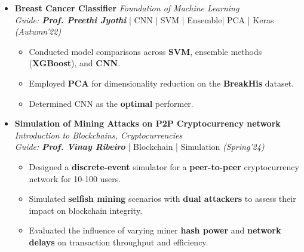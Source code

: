 \documentclass[a4paper,10pt]{article}
\begin{document}
\begin{itemize}[noitemsep,nolistsep]
\begin{itemize}[noitemsep,nolistsep]
    \item Built transformer-based neural machine translation on the CFLIT Hindi dataset for accurate cross-lingual translation.
    \vspace{0.07cm}
    
    \item Implemented text-to-speech synthesis to complete the end-to-end document-to-audio pipeline.
\end{itemize}

\item \textbf{Breast Cancer Classifier} \hfill {\emph{Foundation of Machine Learning}}\\
\emph{Guide: \textbf{Prof. Preethi Jyothi}} | CNN | SVM | Ensemble| PCA | Keras \hfill
\emph{(Autumn'22)}
\begin{itemize}[noitemsep,nolistsep]
\vspace{0.1cm}
    \item Conducted model comparisons across \textbf{SVM}, ensemble methods (\textbf{XGBoost}), and \textbf{CNN}.
    \vspace{0.07cm}
    
    \item Employed \textbf{PCA} for dimensionality reduction on the \textbf{BreakHis} dataset.    
    \vspace{0.07cm}

    \item Determined CNN as the \textbf{optimal} performer.
\end{itemize}
\vspace{0.2cm}

\item \textbf{Simulation of Mining Attacks on P2P Cryptocurrency network}  \hfill {\emph{Introduction to Blockchains, Cryptocurrencies}}\\
\emph{Guide: \textbf{Prof. Vinay Ribeiro}} | Blockchain | Simulation  \hfill
\emph{(Spring'24)}
\vspace{0.1cm}
\begin{itemize}[noitemsep,nolistsep]
    \item Designed a \textbf{discrete-event} simulator for a \textbf{peer-to-peer} cryptocurrency network for 10-100 users.
    \vspace{0.07cm}
    \item Simulated \textbf{selfish mining} scenarios with \textbf{dual attackers} to assess their impact on blockchain integrity.
    \vspace{0.07cm}
    \item Evaluated the influence of varying miner \textbf{hash power} and \textbf{network delays} on transaction throughput and efficiency.
\end{itemize}
\vspace{0.15cm}
\end{itemize}
\end{document}
